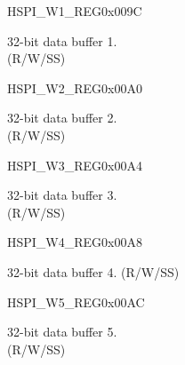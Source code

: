 \begin{register}{H}{SPI\_W1\_REG}{0x009C}\label{regdesc:SPIW1REG}
%
\regnewline%
\begin{regdesc}\begin{reglist}
\label{fielddesc:SPIBUF1}\item [SPI\_BUF1] 32-bit data buffer 1. \\ (R/W/SS)
\end{reglist}\end{regdesc}
\end{register}


\begin{register}{H}{SPI\_W2\_REG}{0x00A0}\label{regdesc:SPIW2REG}
%
\regnewline%
\begin{regdesc}\begin{reglist}
\label{fielddesc:SPIBUF2}\item [SPI\_BUF2] 32-bit data buffer 2. \\ (R/W/SS)
\end{reglist}\end{regdesc}
\end{register}


\begin{register}{H}{SPI\_W3\_REG}{0x00A4}\label{regdesc:SPIW3REG}
%
\regnewline%
\begin{regdesc}\begin{reglist}
\label{fielddesc:SPIBUF3}\item [SPI\_BUF3] 32-bit data buffer 3. \\ (R/W/SS)
\end{reglist}\end{regdesc}
\end{register}


\begin{register}{H}{SPI\_W4\_REG}{0x00A8}\label{regdesc:SPIW4REG}
%
\regnewline%
\begin{regdesc}\begin{reglist}
\label{fielddesc:SPIBUF4}\item [SPI\_BUF4] 32-bit data buffer 4. (R/W/SS)
\end{reglist}\end{regdesc}
\end{register}


\begin{register}{H}{SPI\_W5\_REG}{0x00AC}\label{regdesc:SPIW5REG}
%
\regnewline%
\begin{regdesc}\begin{reglist}
\label{fielddesc:SPIBUF5}\item [SPI\_BUF5] 32-bit data buffer 5. \\ (R/W/SS)
\end{reglist}\end{regdesc}
\end{register}


